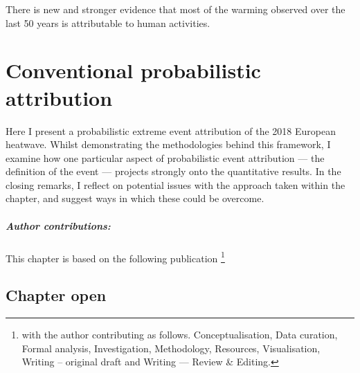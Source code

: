 {\onehalfspacing%
\begin{savequote}[8cm]
  There is new and stronger evidence that most of the warming observed over the last 50 years is attributable to human activities.
\end{savequote}
    
\chapter{\label{ch2}Conventional probabilistic attribution} 

Here I present a probabilistic extreme event attribution of the 2018 European heatwave. Whilst demonstrating the methodologies behind this framework, I examine how one particular aspect of probabilistic event attribution --- the definition of the event --- projects strongly onto the quantitative results. In the closing remarks, I reflect on potential issues with the approach taken within the chapter, and suggest ways in which these could be overcome.
{\small\paragraph{Author contributions:} This chapter is based on the following publication \footnote{with the author contributing as follows. Conceptualisation, Data curation, Formal analysis, Investigation, Methodology, Resources, Visualisation, Writing -- original draft and Writing --- Review \& Editing.} \par\vspace{1em}
}

\clearpage

\minitoc

\clearpage}

\section{Chapter open}\label{ch2:open}

